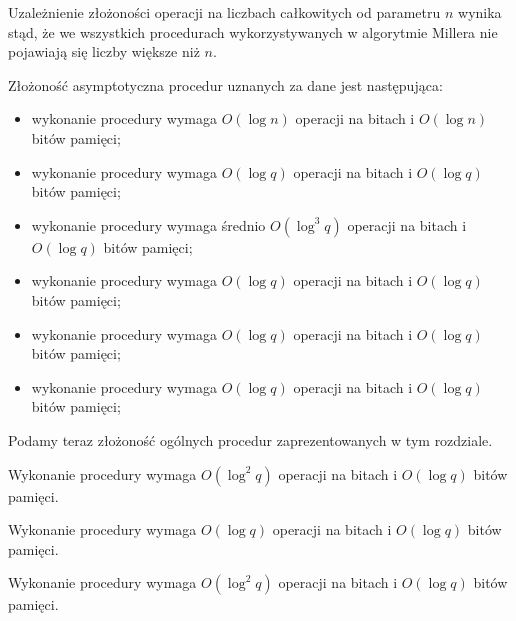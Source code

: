 \begin{remark}
Uzależnienie złożoności operacji na liczbach całkowitych od parametru $n$
wynika stąd,
że we wszystkich procedurach wykorzystywanych w algorytmie Millera
nie pojawiają się liczby większe niż $n$.
\end{remark}

\begin{remark}
Złożoność asymptotyczna procedur uznanych za dane jest następująca:
\begin{itemize}
\item
wykonanie procedury 
wymaga $O(\log n)$ operacji na bitach i $O(\log n)$ bitów pamięci;
\item
wykonanie procedury 
wymaga $O(\log q)$ operacji na bitach i $O(\log q)$ bitów pamięci;
\item
wykonanie procedury 
wymaga średnio $O(\log^3 q)$ operacji na bitach i $O(\log q)$ bitów pamięci;
\item
wykonanie procedury 
wymaga $O(\log q)$ operacji na bitach \linebreak i $O(\log q)$ bitów pamięci;
\item
wykonanie procedury 
wymaga $O(\log q)$ operacji na bitach i $O(\log q)$ bitów pamięci;
\item
wykonanie procedury 
wymaga $O(\log q)$ operacji na bitach i $O(\log q)$ bitów pamięci;
\end{itemize}
\end{remark}

\noindent
Podamy teraz złożoność ogólnych procedur
zaprezentowanych w tym rozdziale.

\begin{fact}
Wykonanie procedury 
wymaga $O(\log^2 q)$ operacji na bitach i $O(\log q)$ bitów pamięci.
\end{fact}

\begin{fact}
Wykonanie procedury 
wymaga \linebreak $O(\log q)$ operacji na bitach i $O(\log q)$ bitów pamięci.
\end{fact}

\begin{fact}
Wykonanie procedury 
\linebreak wymaga $O(\log^2 q)$ operacji na bitach i $O(\log q)$ bitów pamięci.
\end{fact}

